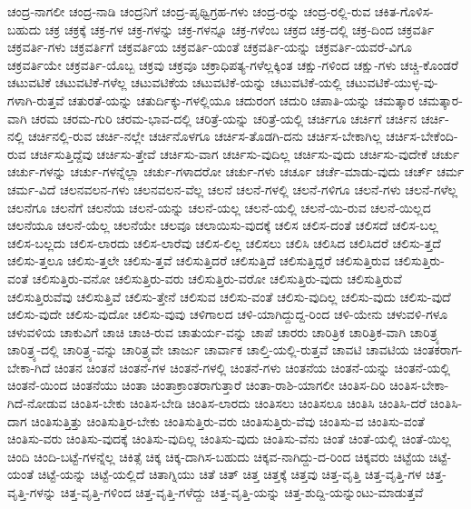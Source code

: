 {ಚಂದ್ರ-ನಾಗಲೀ
ಚಂದ್ರ-ನಾಡಿ
ಚಂದ್ರನಿಗೆ
ಚಂದ್ರ-ಪೃಥ್ವಿಗ್ರಹ-ಗಳು
ಚಂದ್ರ-ರನ್ನು
ಚಂದ್ರ-ರಲ್ಲಿ-ರುವ
ಚಕಿತ-ಗೊಳಿಸ-ಬಹುದು
ಚಕ್ರ
ಚಕ್ರಕ್ಕೆ
ಚಕ್ರ-ಗಳ
ಚಕ್ರ-ಗಳನ್ನು
ಚಕ್ರ-ಗಳನ್ನೂ
ಚಕ್ರ-ಗಳೆಂಬ
ಚಕ್ರದ
ಚಕ್ರ-ದಲ್ಲಿ
ಚಕ್ರ-ದಿಂದ
ಚಕ್ರವರ್ತಿ
ಚಕ್ರವರ್ತಿ-ಗಳು
ಚಕ್ರವರ್ತಿಗೆ
ಚಕ್ರವರ್ತಿಯ
ಚಕ್ರವರ್ತಿ-ಯಂತೆ
ಚಕ್ರವರ್ತಿ-ಯನ್ನು
ಚಕ್ರವರ್ತಿ-ಯವರೆ-ವಿಗೂ
ಚಕ್ರವರ್ತಿಯೇ
ಚಕ್ರವರ್ತಿ-ಯೊಬ್ಬ
ಚಕ್ರವು
ಚಕ್ರವೂ
ಚಕ್ರಾಧಿಪತ್ಯ-ಗಳೆಲ್ಲಕ್ಕಿಂತ
ಚಕ್ಷು-ಗಳಿಂದ
ಚಕ್ಷು-ಗಳು
ಚಚ್ಚಿ-ಕೊಂಡರೆ
ಚಟುವಟಿಕೆ
ಚಟುವಟಿಕೆ-ಗಳೆಲ್ಲ
ಚಟುವಟಿಕೆಯ
ಚಟುವಟಿಕೆ-ಯನ್ನು
ಚಟುವಟಿಕೆ-ಯಲ್ಲಿ
ಚಟುವಟಿಕೆ-ಯುಳ್ಳ-ವು-ಗಳಾಗಿ-ರುತ್ತವೆ
ಚತುರತೆ-ಯನ್ನು
ಚತುರ್ದಿಕ್ಕು-ಗಳಲ್ಲಿಯೂ
ಚದುರಂಗ
ಚದುರಿ
ಚಪಾತಿ-ಯನ್ನು
ಚಮತ್ಕಾರ
ಚಮತ್ಕಾರ-ವಾಗಿ
ಚರಮ
ಚರಮ-ಗುರಿ
ಚರಮ-ಭಾವ-ದಲ್ಲಿ
ಚರಿತ್ರೆ-ಯನ್ನು
ಚರಿತ್ರೆ-ಯಲ್ಲಿ
ಚರ್ಚಿಗೂ
ಚರ್ಚಿಗೆ
ಚರ್ಚಿನ
ಚರ್ಚಿ-ನಲ್ಲಿ
ಚರ್ಚಿನಲ್ಲಿ-ರುವ
ಚರ್ಚಿ-ನಲ್ಲೇ
ಚರ್ಚಿನೊಳಗೂ
ಚರ್ಚಿಸ-ತೊಡಗಿ-ದನು
ಚರ್ಚಿಸ-ಬೇಕಾಗಿಲ್ಲ
ಚರ್ಚಿಸ-ಬೇಕೆಂದಿ-ರುವ
ಚರ್ಚಿಸುತ್ತಿದ್ದೆವು
ಚರ್ಚಿಸು-ತ್ತೇವೆ
ಚರ್ಚಿಸು-ವಾಗ
ಚರ್ಚಿಸು-ವುದಿಲ್ಲ
ಚರ್ಚಿಸು-ವುದು
ಚರ್ಚಿಸು-ವುದೇಕೆ
ಚರ್ಚು
ಚರ್ಚು-ಗಳನ್ನು
ಚರ್ಚು-ಗಳನ್ನೆಲ್ಲಾ
ಚರ್ಚು-ಗಳಾದರೋ
ಚರ್ಚು-ಗಳು
ಚರ್ಚೂ
ಚರ್ಚೆ-ಮಾಡು-ವುದು
ಚರ್ಚ್
ಚರ್ಮ
ಚರ್ಮ-ವಿದೆ
ಚಲನವಲನ-ಗಳು
ಚಲನವಲನ-ವೆಲ್ಲ
ಚಲನೆ
ಚಲನೆ-ಗಳಲ್ಲಿ
ಚಲನೆ-ಗಳಿಗೂ
ಚಲನೆ-ಗಳು
ಚಲನೆ-ಗಳೆಲ್ಲ
ಚಲನೆಗೂ
ಚಲನೆಗೆ
ಚಲನೆಯ
ಚಲನೆ-ಯನ್ನು
ಚಲನೆ-ಯಲ್ಲ
ಚಲನೆ-ಯಲ್ಲಿ
ಚಲನೆ-ಯಿ-ರುವ
ಚಲನೆ-ಯಿಲ್ಲದ
ಚಲನೆಯೂ
ಚಲನೆ-ಯೆಲ್ಲ
ಚಲನೆಯೇ
ಚಲವೂ
ಚಲಾಯಿಸು-ವುದಕ್ಕೆ
ಚಲಿಸ
ಚಲಿಸ-ದಂತೆ
ಚಲಿಸದೆ
ಚಲಿಸ-ಬಲ್ಲ
ಚಲಿಸ-ಬಲ್ಲದು
ಚಲಿಸ-ಲಾರದು
ಚಲಿಸ-ಲಾರೆವು
ಚಲಿಸ-ಲಿಲ್ಲ
ಚಲಿಸಲು
ಚಲಿಸಿ
ಚಲಿಸಿದ
ಚಲಿಸಿದರೆ
ಚಲಿಸು-ತ್ತದೆ
ಚಲಿಸು-ತ್ತಲೂ
ಚಲಿಸು-ತ್ತಲೇ
ಚಲಿಸು-ತ್ತವೆ
ಚಲಿಸುತ್ತಿದರೆ
ಚಲಿಸುತ್ತಿದೆ
ಚಲಿಸುತ್ತಿದ್ದರೆ
ಚಲಿಸುತ್ತಿರುವ
ಚಲಿಸುತ್ತಿರು-ವಂತೆ
ಚಲಿಸುತ್ತಿರು-ವನೋ
ಚಲಿಸುತ್ತಿರು-ವರು
ಚಲಿಸುತ್ತಿರು-ವರೋ
ಚಲಿಸುತ್ತಿರು-ವುದು
ಚಲಿಸುತ್ತಿರುವೆ
ಚಲಿಸುತ್ತಿರುವೆವು
ಚಲಿಸುತ್ತಿವೆ
ಚಲಿಸು-ತ್ತೇನೆ
ಚಲಿಸುವ
ಚಲಿಸು-ವಂತೆ
ಚಲಿಸು-ವುದಿಲ್ಲ
ಚಲಿಸು-ವುದು
ಚಲಿಸು-ವುದೆ
ಚಲಿಸು-ವುದೇ
ಚಲಿಸು-ವುದೋ
ಚಲಿಸು-ವುವು
ಚಳಿಗಾಲದ
ಚಳಿ-ಯಾಗಿದ್ದುದ್ದ-ರಿಂದ
ಚಳಿ-ಯೇನು
ಚಳುವಳಿ-ಗಳೂ
ಚಳುವಳಿಯ
ಚಾಕುವಿಗೆ
ಚಾಚಿ
ಚಾಚಿ-ರುವ
ಚಾತುರ್ಯ-ವನ್ನು
ಚಾಪೆ
ಚಾರರು
ಚಾರಿತ್ರಿಕ
ಚಾರಿತ್ರಿಕ-ವಾಗಿ
ಚಾರಿತ್ರ್ಯ
ಚಾರಿತ್ರ್ಯ-ದಲ್ಲಿ
ಚಾರಿತ್ರ್ಯ-ವನ್ನು
ಚಾರಿತ್ರ್ಯವೇ
ಚಾರ್ಜು
ಚಾರ್ವಾಕ
ಚಾಲ್ತಿ-ಯಲ್ಲಿ-ರುತ್ತವೆ
ಚಾವಟಿ
ಚಾವಟಿಯ
ಚಿಂತಕರಾಗ-ಬೇಕಾ-ಗಿದೆ
ಚಿಂತನ
ಚಿಂತನೆ
ಚಿಂತನೆ-ಗಳ
ಚಿಂತನೆ-ಗಳಲ್ಲಿ
ಚಿಂತನೆ-ಗಳು
ಚಿಂತನೆಯ
ಚಿಂತನೆ-ಯನ್ನು
ಚಿಂತನೆ-ಯಲ್ಲಿ
ಚಿಂತನೆ-ಯಿಂದ
ಚಿಂತನೆಯು
ಚಿಂತಾ
ಚಿಂತಾಕ್ರಾಂತರಾಗುತ್ತಾರೆ
ಚಿಂತಾ-ರಾಶಿ-ಯಾಗಲೀ
ಚಿಂತಿಸ-ದಿರಿ
ಚಿಂತಿಸ-ಬೇಕಾ-ಗಿದೆ-ನೋಡುವ
ಚಿಂತಿಸ-ಬೇಕು
ಚಿಂತಿಸ-ಬೇಡಿ
ಚಿಂತಿಸ-ಲಾರದು
ಚಿಂತಿಸಲು
ಚಿಂತಿಸಲೂ
ಚಿಂತಿಸಿ
ಚಿಂತಿಸಿ-ದರೆ
ಚಿಂತಿಸಿ-ದಾಗ
ಚಿಂತಿಸುತ್ತಿತ್ತು
ಚಿಂತಿಸುತ್ತಿರ-ಬೇಕು
ಚಿಂತಿಸುತ್ತಿರು-ವರು
ಚಿಂತಿಸುತ್ತಿರು-ವೆವು
ಚಿಂತಿಸು-ವ
ಚಿಂತಿಸು-ವಂತೆ
ಚಿಂತಿಸು-ವರು
ಚಿಂತಿಸು-ವುದಕ್ಕೆ
ಚಿಂತಿಸು-ವುದಿಲ್ಲ
ಚಿಂತಿಸು-ವುದು
ಚಿಂತಿಸು-ವೆನು
ಚಿಂತೆ
ಚಿಂತೆ-ಯಲ್ಲಿ
ಚಿಂತೆ-ಯಿಲ್ಲ
ಚಿಂದಿ
ಚಿಂದಿ-ಬಟ್ಟೆ-ಗಳನ್ನೆಲ್ಲ
ಚಿಕಿತ್ಸೆ
ಚಿಕ್ಕ
ಚಿಕ್ಕ-ದಾಗಿಸ-ಬಹುದು
ಚಿಕ್ಕವ-ನಾಗಿದ್ದು-ದ-ರಿಂದ
ಚಿಕ್ಕವರು
ಚಿಟ್ಟೆಯ
ಚಿಟ್ಟೆ-ಯಂತೆ
ಚಿಟ್ಟೆ-ಯನ್ನು
ಚಿಟ್ಟೆ-ಯಲ್ಲಿದೆ
ಚಿತಾಗ್ನಿಯು
ಚಿತೆ
ಚಿತ್
ಚಿತ್ತ
ಚಿತ್ತಕ್ಕೆ
ಚಿತ್ತವು
ಚಿತ್ತ-ವೃತ್ತಿ
ಚಿತ್ತ-ವೃತ್ತಿ-ಗಳ
ಚಿತ್ತ-ವೃತ್ತಿ-ಗಳನ್ನು
ಚಿತ್ತ-ವೃತ್ತಿ-ಗಳಿಂದ
ಚಿತ್ತ-ವೃತ್ತಿ-ಗಳೆದ್ದು
ಚಿತ್ತ-ವೃತ್ತಿ-ಯನ್ನು
ಚಿತ್ತ-ಶುದ್ದಿ-ಯನ್ನುಂಟು-ಮಾಡುತ್ತವೆ
}
